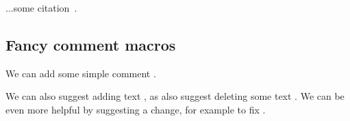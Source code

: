 ...some citation~\cite{Warren1890}.

\subsection{Fancy comment macros}

We can add some simple comment .

We can also suggest adding text , as also
suggest deleting some text .
We can be even more helpful by suggesting a change, for example to fix
.
